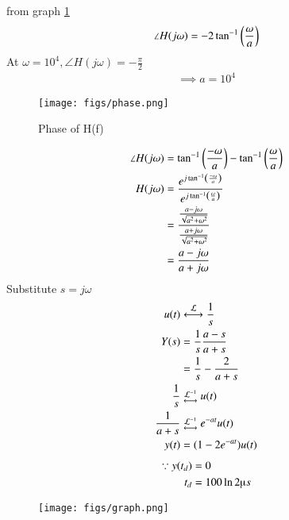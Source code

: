 \documentclass[journal,12pt,twocolumn]{IEEEtran}
\theoremstyle{remark}
\begin{document}
from graph \ref{Phase of H(f)}
\begin{align}
    \angle {H(j\omega)} = -2 \tan^{-1}\left(\frac{\omega}{a}\right)
\end{align}
At $\omega = 10^4, \angle{H(j\omega)} = -\frac{\pi}{2}$
\begin{align}
    \implies a = 10^4 
\end{align}
\begin{figure}[!h]
    \centering
    \texttt{[image: figs/phase.png]}
    \caption{Phase of H(f)}
    \label{Phase of H(f)}
\end{figure}
\begin{align}
    \angle {H(j\omega)} &= \tan^{-1}\left(\frac{-\omega}{a}\right) - \tan^{-1}\left(\frac{\omega}{a}\right)\\
    H(j\omega) &= \frac{e^{j\tan^{-1}\left(\frac{-\omega}{a}\right)}}{e^{j\tan^{-1}\left(\frac{\omega}{a}\right)}}\\
    &= \frac{\frac{a - j\omega}{\sqrt{a^2 + \omega^2}}}{\frac{a + j\omega}{\sqrt{a^2 + \omega^2}}}\\
    &= \frac{a - j\omega}{a + j\omega}
\end{align}
Substitute $s = j\omega$
\begin{align}
    u(t) &\system{\mathcal{L}} \frac{1}{s}\\
    Y(s) &= \frac{1}{s} \frac{a - s}{a + s}\\
    &= \frac{1}{s} - \frac{2}{a + s}\\
    \frac{1}{s} &\mathrel{\substack{\mathcal{L}^{-1}\\\longleftrightarrow}} u(t)\\
    \frac{1}{a + s} &\mathrel{\substack{\mathcal{L}^{-1}\\\longleftrightarrow}} e^{-at} u(t) \\
    y(t) &= (1-2e^{-at}) u(t)
\end{align}
\begin{align}
    \because y(t_d) &= 0 \\
    t_d &= 100 \ln{2} \micro s 
\end{align}
\begin{figure}[!h]
    \centering
    \texttt{[image: figs/graph.png]}
\end{figure}
\end{document}
